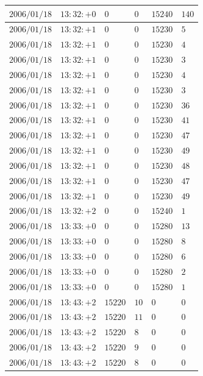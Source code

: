 \documentclass[a4j,papersize,disablejfam,slide,14pt]{jsarticle}
\begin{document}
\begin{description}
\begin{center}
\begin{longtable}{|l|l|l|l|l|l|}
					$2006/01/18$ & $13:32:+0$  & $0$ & $0$ & $15240$ & $140$ \\ \hline
					$2006/01/18$ & $13:32:+1$  & $0$ & $0$ & $15230$ & $5$ \\ \hline
					$2006/01/18$ & $13:32:+1$  & $0$ & $0$ & $15230$ & $4$ \\ \hline
					$2006/01/18$ & $13:32:+1$  & $0$ & $0$ & $15230$ & $3$ \\ \hline
					$2006/01/18$ & $13:32:+1$  & $0$ & $0$ & $15230$ & $4$ \\ \hline
					$2006/01/18$ & $13:32:+1$  & $0$ & $0$ & $15230$ & $3$ \\ \hline
					$2006/01/18$ & $13:32:+1$  & $0$ & $0$ & $15230$ & $36$ \\ \hline
					$2006/01/18$ & $13:32:+1$  & $0$ & $0$ & $15230$ & $41$ \\ \hline
					$2006/01/18$ & $13:32:+1$  & $0$ & $0$ & $15230$ & $47$ \\ \hline
					$2006/01/18$ & $13:32:+1$  & $0$ & $0$ & $15230$ & $49$ \\ \hline
					$2006/01/18$ & $13:32:+1$  & $0$ & $0$ & $15230$ & $48$ \\ \hline
					$2006/01/18$ & $13:32:+1$  & $0$ & $0$ & $15230$ & $47$ \\ \hline
					$2006/01/18$ & $13:32:+1$  & $0$ & $0$ & $15230$ & $49$ \\ \hline
					$2006/01/18$ & $13:32:+2$  & $0$ & $0$ & $15240$ & $1$ \\ \hline
					$2006/01/18$ & $13:33:+0$  & $0$ & $0$ & $15280$ & $13$ \\ \hline
					$2006/01/18$ & $13:33:+0$  & $0$ & $0$ & $15280$ & $8$ \\ \hline
					$2006/01/18$ & $13:33:+0$  & $0$ & $0$ & $15280$ & $6$ \\ \hline
					$2006/01/18$ & $13:33:+0$  & $0$ & $0$ & $15280$ & $2$ \\ \hline
					$2006/01/18$ & $13:33:+0$  & $0$ & $0$ & $15280$ & $1$ \\ \hline
					$2006/01/18$ & $13:43:+2$  & $15220$ & $10$ & $0$ & $0$ \\ \hline
					$2006/01/18$ & $13:43:+2$  & $15220$ & $11$ & $0$ & $0$ \\ \hline
					$2006/01/18$ & $13:43:+2$  & $15220$ & $8$ & $0$ & $0$ \\ \hline
					$2006/01/18$ & $13:43:+2$  & $15220$ & $9$ & $0$ & $0$ \\ \hline
					$2006/01/18$ & $13:43:+2$  & $15220$ & $8$ & $0$ & $0$ \\ \hline

\end{longtable}
\end{center}
\end{description}
\end{document}
